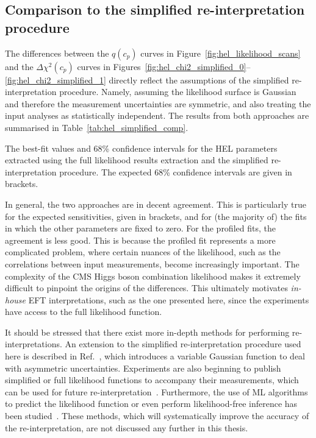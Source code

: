 \subsection{Comparison to the simplified re-interpretation procedure}
The differences between the $q(c_p)$ curves in Figure~\ref{fig:hel_likelihood_scans} and the $\Delta\chi^2(c_p)$ curves in Figures~\ref{fig:hel_chi2_simplified_0}--\ref{fig:hel_chi2_simplified_1} directly reflect the assumptions of the simplified re-interpretation procedure. Namely, assuming the likelihood surface is Gaussian and therefore the measurement uncertainties are symmetric, and also treating the input analyses as statistically independent. The results from both approaches are summarised in Table~\ref{tab:hel_simplified_comp}.

\begin{table}[htb!]
  \centering
  \footnotesize
  \renewcommand{\arraystretch}{1.6}
  \setlength{\tabcolsep}{2pt}
  \caption[Comparison to the HEL parameter constraints from the simplified re-interpretation procedure]
  {
    The best-fit values and 68\% confidence intervals for the HEL parameters extracted using the full likelihood results extraction and the simplified re-interpretation procedure. The expected 68\% confidence intervals are given in brackets.
  }
  \label{tab:hel_simplified_comp}
  
\end{table}

In general, the two approaches are in decent agreement. This is particularly true for the expected sensitivities, given in brackets, and for (the majority of) the fits in which the other parameters are fixed to zero. For the profiled fits, the agreement is less good. This is because the profiled fit represents a more complicated problem, where certain nuances of the likelihood, such as the correlations between input measurements, become increasingly important. The complexity of the CMS Higgs boson combination likelihood makes it extremely difficult to pinpoint the origins of the differences. This ultimately motivates \textit{in-house} EFT interpretations, such as the one presented here, since the experiments have access to the full likelihood function.

It should be stressed that there exist more in-depth methods for performing re-interpretations. An extension to the simplified re-interpretation procedure used here is described in Ref.~\cite{Kraml:2019sis}, which introduces a variable Gaussian function to deal with asymmetric uncertainties. Experiments are also beginning to publish simplified or full likelihood functions to accompany their measurements, which can be used for future re-interpretation~\cite{10.21468SciPostPhys.9.2.022}. Furthermore, the use of ML algorithms to predict the likelihood function or even perform likelihood-free inference has been studied~\cite{Coccaro:2019lgs,Cranmer:2015bka,Brehmer:2020cvb}. These methods, which will systematically improve the accuracy of the re-interpretation, are not discussed any further in this thesis.

